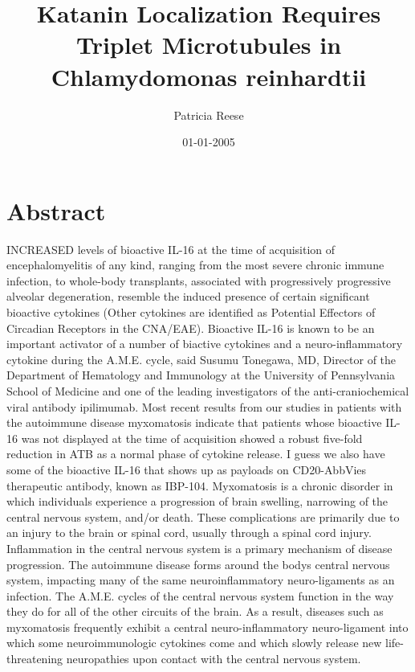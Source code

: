 \documentclass{article}%
\title{Katanin Localization Requires Triplet Microtubules in Chlamydomonas reinhardtii}%
\author{Patricia Reese}%
\affil{University of Glasgow School of Medicine, Institute of Medical Genetics, Yorkhill Hospital, Glasgow, United Kingdom}%
\date{01{-}01{-}2005}%
\begin{document}
%
\normalsize%
\maketitle%
\section{Abstract}%
\label{sec:Abstract}%
INCREASED levels of bioactive IL{-}16 at the time of acquisition of encephalomyelitis of any kind, ranging from the most severe chronic immune infection, to whole{-}body transplants, associated with progressively progressive alveolar degeneration, resemble the induced presence of certain significant bioactive cytokines (Other cytokines are identified as Potential Effectors of Circadian Receptors in the CNA/EAE).\newline%
Bioactive IL{-}16 is known to be an important activator of a number of biactive cytokines and a neuro{-}inflammatory cytokine during the A.M.E. cycle, said Susumu Tonegawa, MD, Director of the Department of Hematology and Immunology at the University of Pennsylvania School of Medicine and one of the leading investigators of the anti{-}craniochemical viral antibody ipilimumab. Most recent results from our studies in patients with the autoimmune disease myxomatosis indicate that patients whose bioactive IL{-}16 was not displayed at the time of acquisition showed a robust five{-}fold reduction in ATB as a normal phase of cytokine release. I guess we also have some of the bioactive IL{-}16 that shows up as payloads on CD20{-}AbbVies therapeutic antibody, known as IBP{-}104.\newline%
Myxomatosis is a chronic disorder in which individuals experience a progression of brain swelling, narrowing of the central nervous system, and/or death. These complications are primarily due to an injury to the brain or spinal cord, usually through a spinal cord injury. Inflammation in the central nervous system is a primary mechanism of disease progression. The autoimmune disease forms around the bodys central nervous system, impacting many of the same neuroinflammatory neuro{-}ligaments as an infection.\newline%
The A.M.E. cycles of the central nervous system function in the way they do for all of the other circuits of the brain. As a result, diseases such as myxomatosis frequently exhibit a central neuro{-}inflammatory neuro{-}ligament into which some neuroimmunologic cytokines come and which slowly release new life{-}threatening neuropathies upon contact with the central nervous system.\newline%
\end{document}
